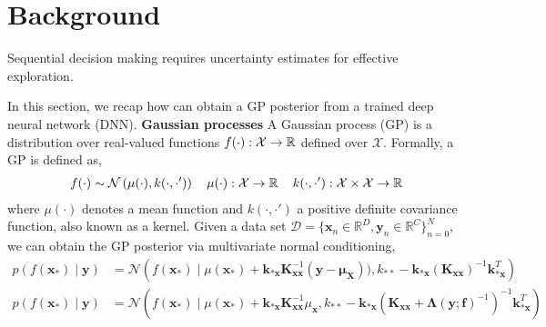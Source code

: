 \documentclass{article}
\newcommand{\dataset}{\ensuremath{\mathcal{D}}}
\newcommand{\inputDomain}{\ensuremath{\mathbb{R}^{D}}}
\newcommand{\outputDomain}{\ensuremath{\mathbb{R}^{C}}}
\newcommand{\transitionFn}{\ensuremath{f}}
\newcommand{\transitionParams}{\ensuremath{\mathbf{w}}}
\newcommand{\transitionFnWithParams}{\ensuremath{\transitionFn_{\transitionParams}}}
\begin{document}
\section{Background} \label{sec:background}
Sequential decision making requires uncertainty estimates for effective exploration. 


In this section, we recap how can obtain a GP posterior from a trained deep neural network (DNN).
\textbf{Gaussian processes}
A Gaussian process (GP) is a distribution over real-valued functions $f(\cdot): \mathcal{X} \rightarrow \operatorname{\mathbb{R}}$ defined over $\mathcal{X}$.
Formally, a GP is defined as,
\begin{align}
\label{eq-gp-prior}
  f(\cdot) \sim \mathcal{N}\left( \mu(\cdot), k(\cdot,\cdot') \right) \quad
  \mu(\cdot): \mathcal{X} \rightarrow \operatorname{\mathbb{R}} \quad
  k(\cdot,\cdot'): \mathcal{X} \times \mathcal{X} \rightarrow \operatorname{\mathbb{R}}
\end{align}
where $\mu(\cdot)$ denotes a mean function and $k(\cdot,\cdot')$ a positive definite covariance function, also known as a kernel.
Given a data set $\dataset = \{\mathbf{x}_{n} \in \inputDomain, \mathbf{y}_{n} \in \outputDomain\}_{n=0}^{N}$,
we can obtain the GP posterior via multivariate normal conditioning,
\begin{align}
\label{eq-gp-predictive-posterior}
  p(f(\mathbf{x}_{*}) \mid \mathbf{y}) &= \mathcal{N}
  \left( f(\mathbf{x}_{*}) \mid \mu(\mathbf{x}_{*}) + \mathbf{k}_{*\mathbf{x}} \mathbf{K}^{-1}_{\mathbf{x}\mathbf{x}} (\mathbf{y} - \bm\mu_{\mathbf{X}})),
  k_{**} - \mathbf{k}_{*\mathbf{x}} \left(\mathbf{K}_{\mathbf{x}\mathbf{x}} \right)^{-1} \mathbf{k}_{*\mathbf{x}}^{T} \right)
\end{align}
\begin{align}
\label{eq-gp-predictive-posterior}
  p(f(\mathbf{x}_{*}) \mid \mathbf{y}) &= \mathcal{N}
  \left( f(\mathbf{x}_{*}) \mid \mu(\mathbf{x}_{*}) + \mathbf{k}_{*\mathbf{x}} \mathbf{K}^{-1}_{\mathbf{x}\mathbf{x}} \mu_{\mathbf{x}},
  k_{**} - \mathbf{k}_{*\mathbf{x}} \left(\mathbf{K}_{\mathbf{x}\mathbf{x}} + \bm\Lambda(\mathbf{y} ; \mathbf{f})^{-1} \right)^{-1} \mathbf{k}_{*\mathbf{x}}^{T} \right)
\end{align}
\end{document}
